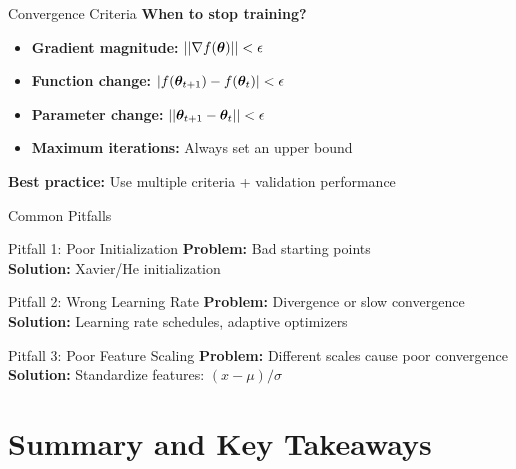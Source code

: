 \documentclass[usenames,dvipsnames]{beamer}
\begin{document}
  \begin{frame}{Convergence Criteria}
    \textbf{When to stop training?}
    
    \begin{itemize}[<+->]
        \item \textbf{Gradient magnitude:} $||\nabla f(\boldsymbol{\theta})|| < \epsilon$
        \item \textbf{Function change:} $|f(\boldsymbol{\theta}_{t+1}) - f(\boldsymbol{\theta}_t)| < \epsilon$
        \item \textbf{Parameter change:} $||\boldsymbol{\theta}_{t+1} - \boldsymbol{\theta}_t|| < \epsilon$
        \item \textbf{Maximum iterations:} Always set an upper bound
    \end{itemize}
    
    \pause
    \begin{keypointsbox}{}
    \textbf{Best practice:} Use multiple criteria + validation performance
    \end{keypointsbox}
  \end{frame}

  \begin{frame}{Common Pitfalls}
    \begin{alertbox}{Pitfall 1: Poor Initialization}
    \textbf{Problem:} Bad starting points
    \\\textbf{Solution:} Xavier/He initialization
    \end{alertbox}
    
    \pause
    \begin{alertbox}{Pitfall 2: Wrong Learning Rate}
    \textbf{Problem:} Divergence or slow convergence
    \\\textbf{Solution:} Learning rate schedules, adaptive optimizers
    \end{alertbox}
    
    \pause
    \begin{alertbox}{Pitfall 3: Poor Feature Scaling}
    \textbf{Problem:} Different scales cause poor convergence
    \\\textbf{Solution:} Standardize features: $(x - \mu)/\sigma$
    \end{alertbox}
  \end{frame}

  \section{Summary and Key Takeaways}
\end{document}
